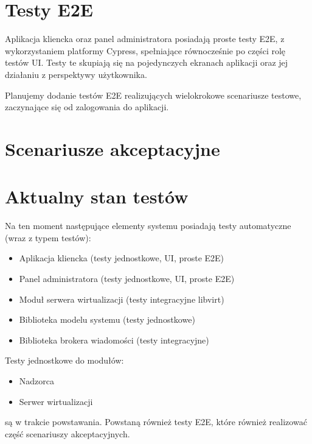 \documentclass[12pt]{article}
\begin{document}
\section{Testy E2E}
Aplikacja kliencka oraz panel administratora posiadają proste testy E2E, z wykorzystaniem platformy Cypress, spełniające równocześnie po części rolę testów UI. Testy te skupiają się na pojedynczych ekranach aplikacji oraz jej działaniu z perspektywy użytkownika.

Planujemy dodanie testów E2E realizujących wielokrokowe scenariusze testowe, zaczynające się od zalogowania do aplikacji.

\section{Scenariusze akceptacyjne}

\section{Aktualny stan testów}
Na ten moment następujące elementy systemu posiadają testy automatyczne (wraz z typem testów):
\begin{itemize}
	\item Aplikacja kliencka (testy jednostkowe, UI, proste E2E)
	\item Panel administratora (testy jednostkowe, UI, proste E2E)
	\item Moduł serwera wirtualizacji (testy integracyjne libvirt)
	\item Biblioteka modelu systemu (testy jednostkowe)
	\item Biblioteka brokera wiadomości (testy integracyjne)
\end{itemize}
Testy jednostkowe do modułów:
\begin{itemize}
	\item Nadzorca
	\item Serwer wirtualizacji
\end{itemize}
są w trakcie powstawania.
Powstaną również testy E2E, które również realizować część scenariuszy akceptacyjnych.
\end{document}
